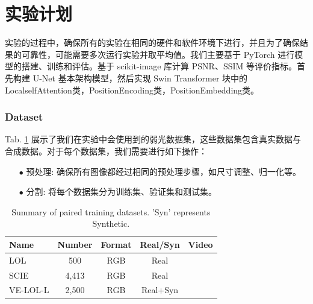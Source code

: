 \documentclass[a4paper]{ctexart}
\begin{document}
		\section{实验计划}

		实验的过程中，确保所有的实验在相同的硬件和软件环境下进行，并且为了确保结果的可靠性，可能需要多次运行实验并取平均值。我们主要基于 PyTorch 进行模型的搭建、训练和评估。基于 scikit-image 库计算 PSNR、SSIM 等评价指标。首先构建 U-Net 基本架构模型，然后实现 Swin Transformer 块中的LocalselfAttention类，PositionEncoding类，PositionEmbedding类。

		\subsubsection{Dataset}
		
		Tab. \ref{tab: Paired_training_datases} 展示了我们在实验中会使用到的弱光数据集，这些数据集包含真实数据与合成数据。对于每个数据集，我们需要进行如下操作：
		
		\begin{itemize}
			\item [$\bullet$]
			预处理: 确保所有图像都经过相同的预处理步骤，如尺寸调整、归一化等。
			
			\item [$\bullet$]
			分割: 将每个数据集分为训练集、验证集和测试集。
		\end{itemize}
		
		\begin{table}[!htbp]
			\centering
			\tiny
				\begin{tabular}{>{\centering\arraybackslash}m{2.5cm}|c|c|c|c}
					
					\hline
					
					\textbf{Name} & \textbf{Number} & \textbf{Format} & \textbf{Real/Syn} & \textbf{Video} \\
					
					\hline
					
					LOL\cite{wei2018deep} & 500 & RGB & Real & \\
					
					SCIE\cite{cai2018learning} & 4,413 & RGB & Real & \\
					
					VE-LOL-L\cite{jiang2019learning} & 2,500 & RGB & Real+Syn & \\
					
					\hline
					
				\end{tabular}
			\captionsetup{font=scriptsize} %
			\caption{\label{tab: Paired_training_datases}
				Summary of paired training datasets. 'Syn' represents Synthetic.} %
			
		\end{table}
		
\end{document}
